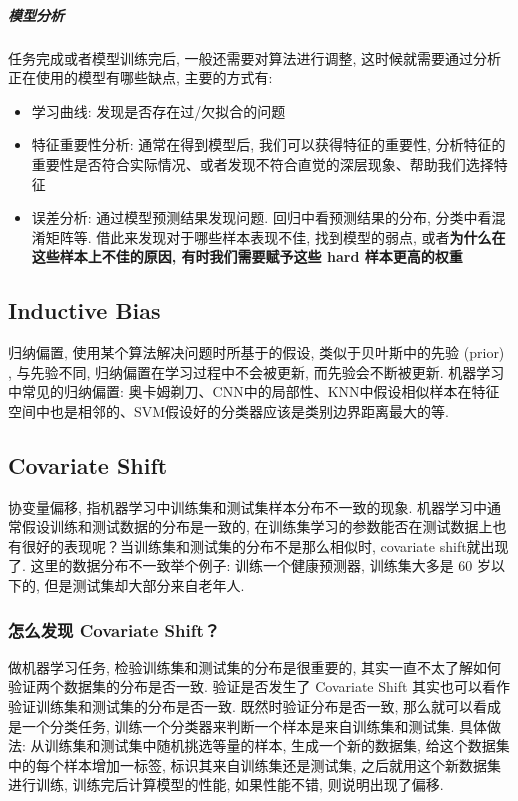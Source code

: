 \subparagraph{模型分析}任务完成或者模型训练完后, 一般还需要对算法进行调整, 这时候就需要通过分析正在使用的模型有哪些缺点, 主要的方式有: 
\begin{itemize}
	\item 学习曲线: 发现是否存在过/欠拟合的问题
	\item 特征重要性分析: 通常在得到模型后, 我们可以获得特征的重要性, 分析特征的重要性是否符合实际情况、或者发现不符合直觉的深层现象、帮助我们选择特征
	\item 误差分析: 通过模型预测结果发现问题. 回归中看预测结果的分布, 分类中看混淆矩阵等. 借此来发现对于哪些样本表现不佳, 找到模型的弱点, 或者\textbf{为什么在这些样本上不佳的原因, 有时我们需要赋予这些 hard 样本更高的权重}
\end{itemize}





\subsection{Inductive Bias}
归纳偏置, 使用某个算法解决问题时所基于的假设, 类似于贝叶斯中的先验 (prior) , 与先验不同, 归纳偏置在学习过程中不会被更新, 而先验会不断被更新. 机器学习中常见的归纳偏置: 奥卡姆剃刀、CNN中的局部性、KNN中假设相似样本在特征空间中也是相邻的、SVM假设好的分类器应该是类别边界距离最大的等. 

\subsection{Covariate Shift}
协变量偏移, 指机器学习中训练集和测试集样本分布不一致的现象. 机器学习中通常假设训练和测试数据的分布是一致的, 在训练集学习的参数能否在测试数据上也有很好的表现呢？当训练集和测试集的分布不是那么相似时, covariate shift就出现了. 这里的数据分布不一致举个例子: 训练一个健康预测器, 训练集大多是 60 岁以下的, 但是测试集却大部分来自老年人. 

\subsubsection{怎么发现 Covariate Shift？}
做机器学习任务, 检验训练集和测试集的分布是很重要的, 其实一直不太了解如何验证两个数据集的分布是否一致. 验证是否发生了 Covariate Shift 其实也可以看作验证训练集和测试集的分布是否一致. 既然时验证分布是否一致, 那么就可以看成是一个分类任务, 训练一个分类器来判断一个样本是来自训练集和测试集. 具体做法: 从训练集和测试集中随机挑选等量的样本, 生成一个新的数据集, 给这个数据集中的每个样本增加一标签, 标识其来自训练集还是测试集, 之后就用这个新数据集进行训练, 训练完后计算模型的性能, 如果性能不错, 则说明出现了偏移. 

